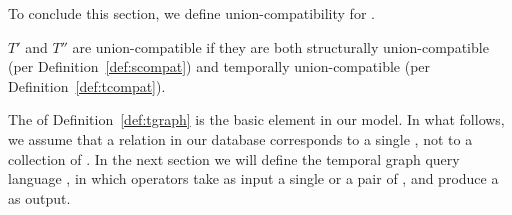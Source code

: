 
To conclude this section, we define union-compatibility for \tgs.

\begin{definition} 
\label{def:tuc} 
$T'$ and $T''$ are union-compatible \tgs if they are both structurally
union-compatible (per Definition~\ref{def:scompat}) and temporally
union-compatible (per Definition~\ref{def:tcompat}).
\end{definition}

The \tg of Definition~\ref{def:tgraph} is the basic element in our
model.  In what follows, we assume that a relation in our database
corresponds to a single \tg, not to a collection of \tgs.  In the next
section we will define the temporal graph query language \ql, in which
operators take as input a single \tg or a pair of \tgs, and produce a
\tg as output.




